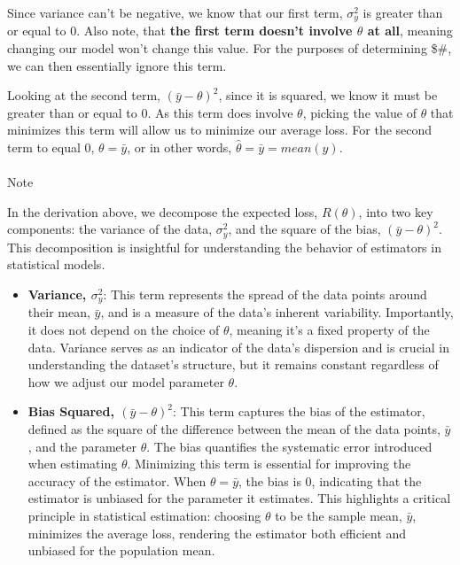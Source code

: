 \documentclass[
  letterpaper,
  DIV=11,
  numbers=noendperiod]{scrreprt}
\makeatletter
\let\oldparagraph\paragraph
\renewcommand{\paragraph}{
    \@ifstar
      \xxxParagraphStar
      \xxxParagraphNoStar
  }
\newcommand{\xxxParagraphStar}[1]{\oldparagraph*{#1}\mbox{}}
\newcommand{\xxxParagraphNoStar}[1]{\oldparagraph{#1}\mbox{}}
\makeatother
\begin{document}
Since variance can't be negative, we know that our first term,
\(\sigma_y^2\) is greater than or equal to \(0\). Also note, that
\textbf{the first term doesn't involve \(\theta\) at all}, meaning
changing our model won't change this value. For the purposes of
determining \$\hat{\theta}\#, we can then essentially ignore this term.

Looking at the second term, \((\bar{y} - \theta)^2\), since it is
squared, we know it must be greater than or equal to \(0\). As this term
does involve \(\theta\), picking the value of \(\theta\) that minimizes
this term will allow us to minimize our average loss. For the second
term to equal \(0\), \(\theta = \bar{y}\), or in other words,
\(\hat{\theta} = \bar{y} = mean(y)\).

\paragraph{Note}\label{note}

In the derivation above, we decompose the expected loss, \(R(\theta)\),
into two key components: the variance of the data, \(\sigma_y^2\), and
the square of the bias, \((\bar{y} - \theta)^2\). This decomposition is
insightful for understanding the behavior of estimators in statistical
models.

\begin{itemize}
\item
  \textbf{Variance, \(\sigma_y^2\)}: This term represents the spread of
  the data points around their mean, \(\bar{y}\), and is a measure of
  the data's inherent variability. Importantly, it does not depend on
  the choice of \(\theta\), meaning it's a fixed property of the data.
  Variance serves as an indicator of the data's dispersion and is
  crucial in understanding the dataset's structure, but it remains
  constant regardless of how we adjust our model parameter \(\theta\).
\item
  \textbf{Bias Squared, \((\bar{y} - \theta)^2\)}: This term captures
  the bias of the estimator, defined as the square of the difference
  between the mean of the data points, \(\bar{y}\), and the parameter
  \(\theta\). The bias quantifies the systematic error introduced when
  estimating \(\theta\). Minimizing this term is essential for improving
  the accuracy of the estimator. When \(\theta = \bar{y}\), the bias is
  \(0\), indicating that the estimator is unbiased for the parameter it
  estimates. This highlights a critical principle in statistical
  estimation: choosing \(\theta\) to be the sample mean, \(\bar{y}\),
  minimizes the average loss, rendering the estimator both efficient and
  unbiased for the population mean.
\end{itemize}
\end{document}
